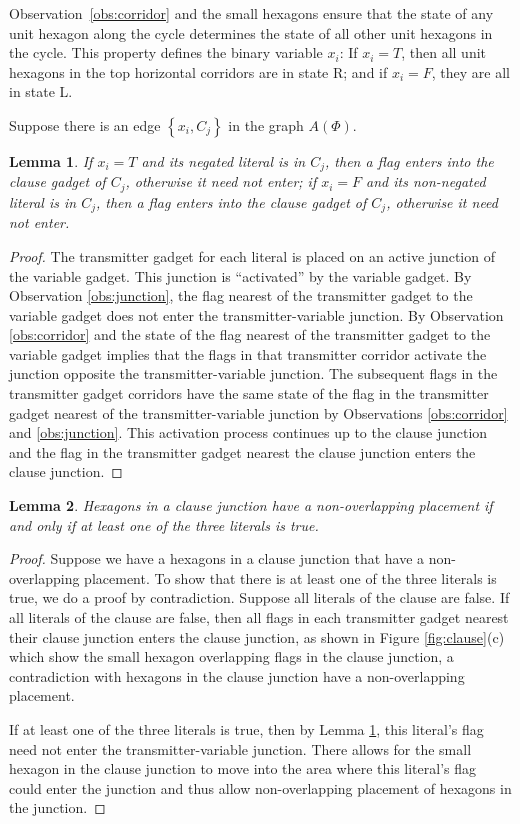 \documentclass[10pt]{CSUNthesis}
\theoremstyle{plain}%
\newtheorem{lem}{Lemma}
\theoremstyle{definition}
\theoremstyle{remark}
\begin{document}
Observation~\ref{obs:corridor} and the small hexagons ensure that the state of any unit hexagon along the cycle determines the state of all other unit hexagons in the cycle. 
This property defines the binary variable $x_i$: If $x_i=T$, then all unit hexagons in the top horizontal corridors are in state R; and if $x_i=F$, they are all in state L.

Suppose there is an edge $\left\lbrace x_i, C_j \right\rbrace$ in the graph $A(\Phi)$.
\begin{lem}\label{lem:aux-3}
If $x_i = T$ and its negated literal is in $C_j$, then a flag enters into the clause gadget of $C_j$, otherwise it need not enter; if $x_i = F$ and its non-negated literal is in $C_j$, then a flag enters into the clause gadget of $C_j$, otherwise it need not enter.
\end{lem}
\begin{proof}
The transmitter gadget for each literal is placed on an active junction of the variable gadget. 
This junction is ``activated'' by the variable gadget.  
By Observation \ref{obs:junction}, the flag nearest of the transmitter gadget to the variable gadget does not enter the transmitter-variable junction.
By Observation \ref{obs:corridor} and the state of the flag nearest of the transmitter gadget to the variable gadget implies that the flags in that transmitter corridor activate the junction opposite the transmitter-variable junction.
The subsequent flags in the transmitter gadget corridors have the same state of the flag in the transmitter gadget nearest of the transmitter-variable junction by Observations \ref{obs:corridor} and \ref{obs:junction}.
This activation process continues up to the clause junction and the flag in the transmitter gadget nearest the clause junction enters the clause junction.
\end{proof}

\begin{lem}\label{lem:aux-1}
Hexagons in a clause junction have a non-overlapping placement if and only if at least one of the three literals is true.
\end{lem}
\begin{proof}
Suppose we have a hexagons in a clause junction that have a non-overlapping placement.
To show that there is at least one of the three literals is true,  we do a proof by contradiction.
Suppose all literals of the clause are false.
If all literals of the clause are false, then all flags in each transmitter gadget nearest their clause junction enters the clause junction, as shown in Figure \ref{fig:clause}(c) which show the small hexagon overlapping flags in the clause junction, a contradiction with hexagons in the clause junction have a non-overlapping placement.

If at least one of the three literals is true, then by Lemma \ref{lem:aux-3}, this literal's flag need not enter the transmitter-variable junction.
There allows for the small hexagon in the clause junction to move into the area where this literal's flag could enter the junction and thus allow non-overlapping placement of hexagons in the junction.
\end{proof}
\end{document}
